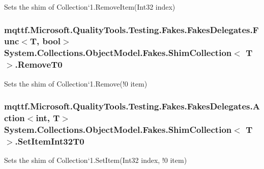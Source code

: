 Sets the shim of Collection`1.Remove\-Item(\-Int32 index)

\hypertarget{class_system_1_1_collections_1_1_object_model_1_1_fakes_1_1_shim_collection_3_01_t_01_4_a0bfaa96e736cfccfc660eec0d5af3574}{
\subsubsection[{Remove\-T0}]{\setlength{\rightskip}{0pt plus 5cm}mqttf.\-Microsoft.\-Quality\-Tools.\-Testing.\-Fakes.\-Fakes\-Delegates.\-Func$<$T, bool$>$ System.\-Collections.\-Object\-Model.\-Fakes.\-Shim\-Collection$<$ T $>$.Remove\-T0\hspace{0.3cm}{\ttfamily [set]}}}\label{class_system_1_1_collections_1_1_object_model_1_1_fakes_1_1_shim_collection_3_01_t_01_4_a0bfaa96e736cfccfc660eec0d5af3574}


Sets the shim of Collection`1.Remove(!0 item)

\hypertarget{class_system_1_1_collections_1_1_object_model_1_1_fakes_1_1_shim_collection_3_01_t_01_4_af4da52513bcb54a7529117bc637757b2}{
\subsubsection[{Set\-Item\-Int32\-T0}]{\setlength{\rightskip}{0pt plus 5cm}mqttf.\-Microsoft.\-Quality\-Tools.\-Testing.\-Fakes.\-Fakes\-Delegates.\-Action$<$int, T$>$ System.\-Collections.\-Object\-Model.\-Fakes.\-Shim\-Collection$<$ T $>$.Set\-Item\-Int32\-T0\hspace{0.3cm}{\ttfamily [set]}}}\label{class_system_1_1_collections_1_1_object_model_1_1_fakes_1_1_shim_collection_3_01_t_01_4_af4da52513bcb54a7529117bc637757b2}


Sets the shim of Collection`1.Set\-Item(Int32 index, !0 item)

